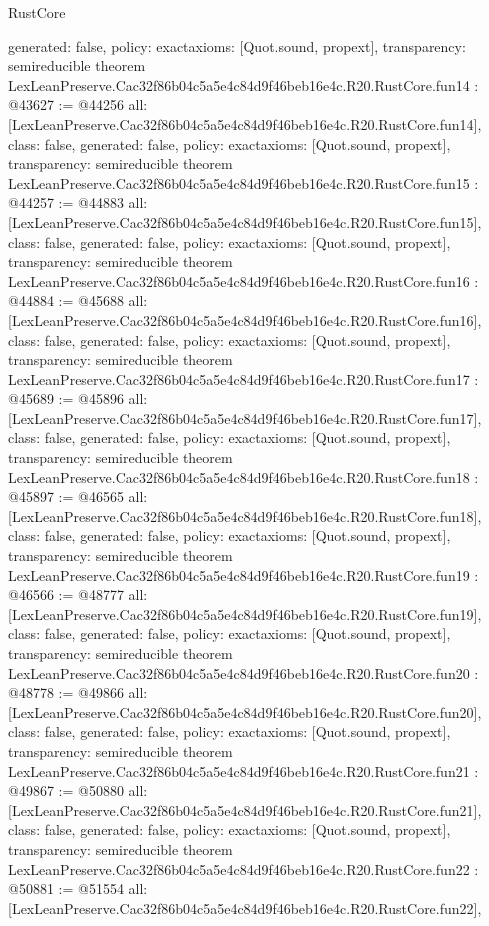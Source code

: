 \begin{lexlean}{RustCore}
\begin{coremodule}
{  generated: false,
  policy: exact{axioms: [Quot.sound, propext]},
  transparency: semireducible
}
theorem LexLeanPreserve.Cac32f86b04c5a5e4c84d9f46beb16e4c.R20.RustCore.fun14 : @43627 := @44256 {
  all: [LexLeanPreserve.Cac32f86b04c5a5e4c84d9f46beb16e4c.R20.RustCore.fun14],
  class: false,
  generated: false,
  policy: exact{axioms: [Quot.sound, propext]},
  transparency: semireducible
}
theorem LexLeanPreserve.Cac32f86b04c5a5e4c84d9f46beb16e4c.R20.RustCore.fun15 : @44257 := @44883 {
  all: [LexLeanPreserve.Cac32f86b04c5a5e4c84d9f46beb16e4c.R20.RustCore.fun15],
  class: false,
  generated: false,
  policy: exact{axioms: [Quot.sound, propext]},
  transparency: semireducible
}
theorem LexLeanPreserve.Cac32f86b04c5a5e4c84d9f46beb16e4c.R20.RustCore.fun16 : @44884 := @45688 {
  all: [LexLeanPreserve.Cac32f86b04c5a5e4c84d9f46beb16e4c.R20.RustCore.fun16],
  class: false,
  generated: false,
  policy: exact{axioms: [Quot.sound, propext]},
  transparency: semireducible
}
theorem LexLeanPreserve.Cac32f86b04c5a5e4c84d9f46beb16e4c.R20.RustCore.fun17 : @45689 := @45896 {
  all: [LexLeanPreserve.Cac32f86b04c5a5e4c84d9f46beb16e4c.R20.RustCore.fun17],
  class: false,
  generated: false,
  policy: exact{axioms: [Quot.sound, propext]},
  transparency: semireducible
}
theorem LexLeanPreserve.Cac32f86b04c5a5e4c84d9f46beb16e4c.R20.RustCore.fun18 : @45897 := @46565 {
  all: [LexLeanPreserve.Cac32f86b04c5a5e4c84d9f46beb16e4c.R20.RustCore.fun18],
  class: false,
  generated: false,
  policy: exact{axioms: [Quot.sound, propext]},
  transparency: semireducible
}
theorem LexLeanPreserve.Cac32f86b04c5a5e4c84d9f46beb16e4c.R20.RustCore.fun19 : @46566 := @48777 {
  all: [LexLeanPreserve.Cac32f86b04c5a5e4c84d9f46beb16e4c.R20.RustCore.fun19],
  class: false,
  generated: false,
  policy: exact{axioms: [Quot.sound, propext]},
  transparency: semireducible
}
theorem LexLeanPreserve.Cac32f86b04c5a5e4c84d9f46beb16e4c.R20.RustCore.fun20 : @48778 := @49866 {
  all: [LexLeanPreserve.Cac32f86b04c5a5e4c84d9f46beb16e4c.R20.RustCore.fun20],
  class: false,
  generated: false,
  policy: exact{axioms: [Quot.sound, propext]},
  transparency: semireducible
}
theorem LexLeanPreserve.Cac32f86b04c5a5e4c84d9f46beb16e4c.R20.RustCore.fun21 : @49867 := @50880 {
  all: [LexLeanPreserve.Cac32f86b04c5a5e4c84d9f46beb16e4c.R20.RustCore.fun21],
  class: false,
  generated: false,
  policy: exact{axioms: [Quot.sound, propext]},
  transparency: semireducible
}
theorem LexLeanPreserve.Cac32f86b04c5a5e4c84d9f46beb16e4c.R20.RustCore.fun22 : @50881 := @51554 {
  all: [LexLeanPreserve.Cac32f86b04c5a5e4c84d9f46beb16e4c.R20.RustCore.fun22],
}
\end{coremodule}
\end{lexlean}
